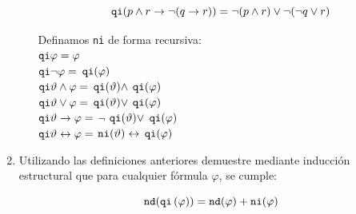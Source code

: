 \documentclass[a4paper]{article}
\begin{document}
\begin{enumerate}
\begin{enumerate}
		$${\tt qi} (p \land r \to \lnot (q \to r)) = \lnot (p \land r) \lor \lnot(\lnot q \lor r)$$
		
		Definamos {\tt ni} de forma recursiva:\\
        ${\tt qi} \varphi=\varphi$\\
        ${\tt qi} \neg\varphi=$ ${\tt qi}(\varphi)$\\
        ${\tt qi} \vartheta \land\varphi=$ ${\tt qi} (\vartheta)\land$ ${\tt qi}(\varphi)$\\
        ${\tt qi} \vartheta \lor\varphi=$ ${\tt qi} (\vartheta)\lor$ ${\tt qi}(\varphi)$\\
        ${\tt qi} \vartheta \to \varphi=$ $\neg$ ${\tt qi} (\vartheta)\lor$ ${\tt qi}(\varphi)$\\
        ${\tt qi} \vartheta \leftrightarrow\varphi=$ ${\tt ni} (\vartheta)\leftrightarrow$ ${\tt qi}(\varphi)$\\
	\end{enumerate}
	\item Utilizando las definiciones anteriores demuestre mediante inducción estructural que para cualquier fórmula $\varphi$, se cumple:

	$${\tt nd}({\tt qi}\,(\varphi)) = {\tt nd}(\varphi) + {\tt ni}(\varphi)$$

\end{enumerate}
\end{document}
